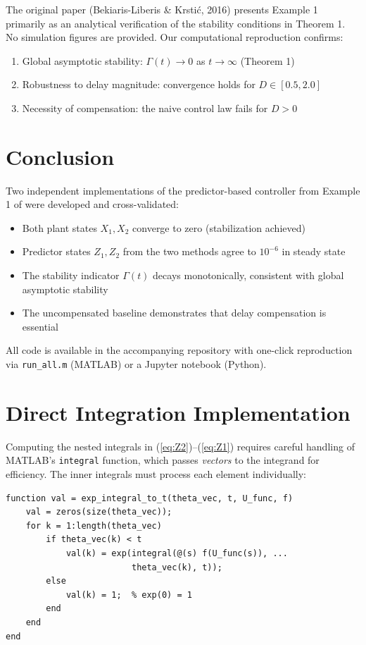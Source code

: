 \documentclass[11pt]{article}
\begin{document}
The original paper (Bekiaris-Liberis \& Krsti\'{c}, 2016) presents Example 1 primarily as an analytical verification of the stability conditions in Theorem 1. No simulation figures are provided. Our computational reproduction confirms:
\begin{enumerate}
\item Global asymptotic stability: $\Gamma(t) \to 0$ as $t \to \infty$ (Theorem 1)
\item Robustness to delay magnitude: convergence holds for $D \in [0.5, 2.0]$
\item Necessity of compensation: the naive control law fails for $D > 0$
\end{enumerate}

\section{Conclusion}

Two independent implementations of the predictor-based controller from Example 1 of \cite{bekiaris2016} were developed and cross-validated:
\begin{itemize}
\item Both plant states $X_1, X_2$ converge to zero (stabilization achieved)
\item Predictor states $Z_1, Z_2$ from the two methods agree to $10^{-6}$ in steady state
\item The stability indicator $\Gamma(t)$ decays monotonically, consistent with global asymptotic stability
\item The uncompensated baseline demonstrates that delay compensation is essential
\end{itemize}

All code is available in the accompanying repository with one-click reproduction via \texttt{run\_all.m} (MATLAB) or a Jupyter notebook (Python).

\appendix
\section{Direct Integration Implementation}\label{sec:directimpl}

Computing the nested integrals in (\ref{eq:Z2})--(\ref{eq:Z1}) requires careful handling of MATLAB's \texttt{integral} function, which passes \emph{vectors} to the integrand for efficiency. The inner integrals must process each element individually:

\begin{lstlisting}
function val = exp_integral_to_t(theta_vec, t, U_func, f)
    val = zeros(size(theta_vec));
    for k = 1:length(theta_vec)
        if theta_vec(k) < t
            val(k) = exp(integral(@(s) f(U_func(s)), ...
                         theta_vec(k), t));
        else
            val(k) = 1;  % exp(0) = 1
        end
    end
end
\end{lstlisting}
\end{document}
